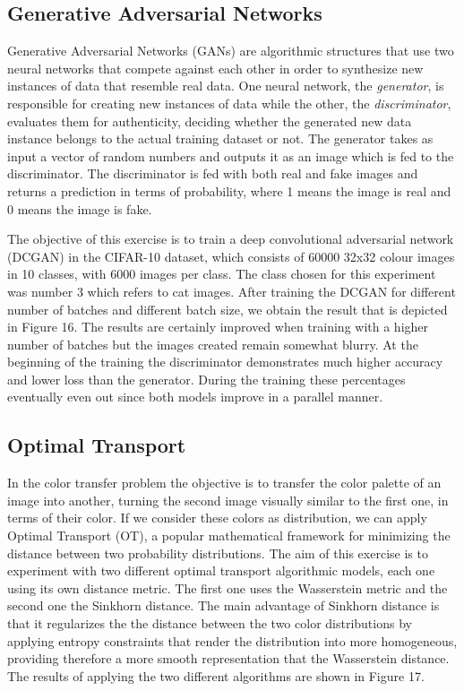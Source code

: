 \documentclass[11pt,conference,compsoc]{IEEEtran}
\begin{document}
\subsection{Generative Adversarial Networks}
Generative Adversarial Networks (GANs) are algorithmic structures that use two neural networks that compete against each other in order to synthesize new instances of data that resemble real data. One neural network, the \textit{generator}, is responsible for creating new instances of data while the other, the \textit{discriminator}, evaluates them for authenticity, deciding whether the generated new data instance belongs to the actual training dataset or not. The generator takes as input a vector of random numbers and outputs it as an image which is fed to the discriminator. The discriminator is fed with both real and fake images and returns a prediction in terms of probability, where 1 means the image is real and 0 means the image is fake. 

The objective of this exercise is to train a deep convolutional adversarial network (DCGAN) in the CIFAR-10 dataset, which consists of 60000 32x32 colour images in 10 classes, with 6000 images per class. The class chosen for this experiment was number 3 which refers to cat images. After training the DCGAN for different number of batches and different batch size, we obtain the result that is depicted in Figure 16. The results are certainly improved when training with a higher number of batches but the images created remain somewhat blurry. At the beginning of the training the discriminator demonstrates much higher accuracy and lower loss than the generator. During the training these percentages eventually even out since both models improve in a parallel manner. 
 
\subsection{Optimal Transport}
In the color transfer problem the objective is to transfer the color palette of an image into another, turning the second image visually similar to the first one, in terms of their color. If we consider these colors as distribution, we can apply Optimal Transport (OT), a popular mathematical framework for minimizing the distance between two probability distributions. The aim of this exercise is to experiment with two different optimal transport algorithmic models, each one using its own distance metric. The first one uses the Wasserstein metric and the second one the Sinkhorn distance. The main advantage of Sinkhorn distance is that it regularizes the the distance between the two color distributions by applying entropy constraints that render the distribution into more homogeneous, providing therefore a more smooth representation that the Wasserstein distance. The results of applying the two different algorithms are shown in Figure 17.
\end{document}
